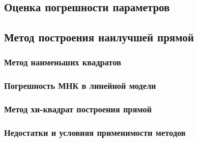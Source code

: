 \documentclass[12pt]{article}
\begin{document}
    \subsection{Оценка погрешности параметров}

    \subsection{Метод построения наилучшей прямой}

      \subsubsection{Метод наименьших квадратов}

      \subsubsection{Погрешность МНК в линейной модели}

      \subsubsection{Метод хи-квадрат построения прямой}

      \subsubsection{Недостатки и условияя применимости методов}
\end{document}
